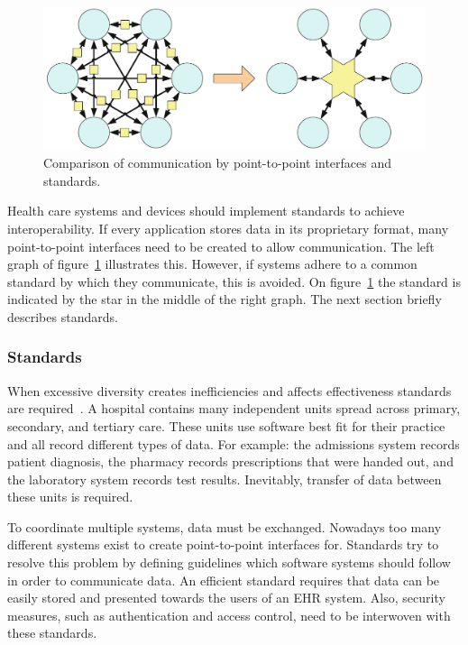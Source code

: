    \begin{figure}[!t]
        \centering
        \includegraphics[width=1\textwidth]{chapters/2_background/interoperability}
        \caption{Comparison of communication by point-to-point interfaces and standards.}\label{fig:interoperability}
    \end{figure}

    \noindent Health care systems and devices should implement standards to achieve interoperability. If every application stores data in its proprietary format, many point-to-point interfaces need to be created to allow communication. The left graph of figure~\ref{fig:interoperability} illustrates this. However, if systems adhere to a common standard by which they communicate, this is avoided. On figure~\ref{fig:interoperability} the standard is indicated by the star in the middle of the right graph. The next section briefly describes standards.

        \subsubsection{Standards}\label{standards}

        When excessive diversity creates inefficiencies and affects effectiveness standards are required~\cite{Shortliffe2014}. A hospital contains many independent units spread across primary, secondary, and tertiary care. These units use software best fit for their practice and all record different types of data. For example: the admissions system records patient diagnosis, the pharmacy records prescriptions that were handed out, and the laboratory system records test results. Inevitably, transfer of data between these units is required. 

        To coordinate multiple systems, data must be exchanged. Nowadays too many different systems exist to create point-to-point interfaces for. Standards try to resolve this problem by defining guidelines which software systems should follow in order to communicate data. An efficient standard requires that data can be easily stored and presented towards the users of an EHR system. Also, security measures, such as authentication and access control, need to be interwoven with these standards.

